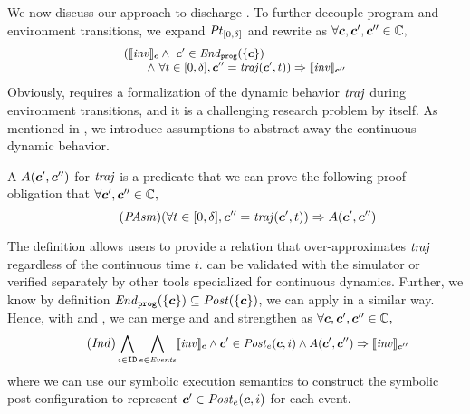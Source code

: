 We now discuss our approach to discharge .
To further decouple program and environment transitions,
we expand $\mathit{Pt}_{[0,\delta]}$  and rewrite  as $\forall \mathit{\boldsymbol{c}}, \mathit{\boldsymbol{c}}', \mathit{\boldsymbol{c}}'' \in \mathbb{C},$
\begin{equation}\label{po:ind-hyp-traj}
\small
\begin{array}{l}
(\llbracket\mathit{inv}\rrbracket_{\mathit{\boldsymbol{c}}} \land\ \mathit{\boldsymbol{c}}' \in \mathit{End}_{\mathtt{prog}}(\left\{\mathit{\boldsymbol{c}}\right\})\\
\qquad  \land\ \forall t \in [0, \delta], \mathit{\boldsymbol{c}}'' = \mathit{traj}(\mathit{\boldsymbol{c}}', t)) \Rightarrow \llbracket\mathit{inv}\rrbracket_{\mathit{\boldsymbol{c}}''}
\end{array}
\end{equation}
Obviously,  requires a formalization of the dynamic behavior $\mathit{traj}$ during environment transitions,
and it is a challenging research problem by itself.
As mentioned in ,
we introduce assumptions to abstract away the continuous dynamic behavior.
\begin{definition}
A \emph{\portasum} $A(\mathit{\boldsymbol{c}}', \mathit{\boldsymbol{c}}'')$ for $\mathit{traj}$ is a predicate that
we can prove the following proof obligation that $\forall \mathit{\boldsymbol{c}}', \mathit{\boldsymbol{c}}'' \in \mathbb{C},$
\begin{equation}\label{po:port-asm}\tag{\textit{PAsm}}
(\forall t \in [0,\delta], \gconfig'' = \traj(\gconfig', t)) \Rightarrow A(\gconfig', \gconfig'')
\end{equation}
\end{definition}
The definition allows users to provide a relation that over-approximates $\mathit{traj}$ regardless of the continuous time $t$.
 can be validated with the \toolname simulator or verified separately by other tools specialized for continuous dynamics.
Further, we know by definition $\mathit{End}_{\mathtt{prog}}(\left\{\mathit{\boldsymbol{c}}\right\}) \subseteq \mathit{Post}(\left\{\mathit{\boldsymbol{c}}\right\})$,
we can apply  in a similar way.
Hence, with  and ,
we can merge  and  and strengthen as
$\forall \mathit{\boldsymbol{c}}, \mathit{\boldsymbol{c}}', \mathit{\boldsymbol{c}}'' \in \mathbb{C},$
\begin{equation}\label{po:ind}\tag{\textit{Ind}}
\small
\bigwedge_{i\in \UINS} \bigwedge_{\Ev \in \Event} \eec{\Inv}{\gconfig} \land \gconfig' \in \Post_\Ev(\gconfig, i)
\land A(\gconfig', \gconfig'')
\Rightarrow \eec{\Inv}{\gconfig''}
\end{equation}
where we can use our \K symbolic execution semantics to construct the symbolic post configuration
to represent $\mathit{\boldsymbol{c}}' \in \mathit{Post}_e(\mathit{\boldsymbol{c}}, i)$ for each event.

